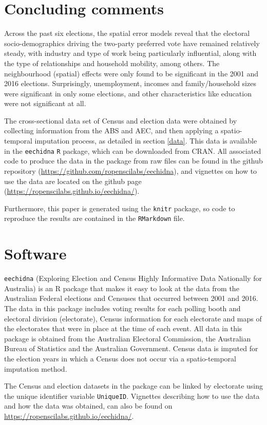 \documentclass[openany]{book}
\begin{document}
\hypertarget{concluding-comments}{%
\chapter{Concluding comments}\label{concluding-comments}}

Across the past six elections, the spatial error models reveal that the electoral socio-demographics driving the two-party preferred vote have remained relatively steady, with industry and type of work being particularly influential, along with the type of relationships and household mobility, among others. The neighbourhood (spatial) effects were only found to be significant in the 2001 and 2016 elections. Surprisingly, unemployment, incomes and family/household sizes were significant in only some elections, and other characteristics like education were not significant at all.

The cross-sectional data set of Census and election data were obtained by collecting information from the ABS and AEC, and then applying a spatio-temporal imputation process, as detailed in section \ref{data}. This data is available in the \texttt{eechidna} \texttt{R} package, which can be downloaded from CRAN. All associated code to produce the data in the package from raw files can be found in the github repository (\url{https://github.com/ropenscilabs/eechidna}), and vignettes on how to use the data are located on the github page (\url{https://ropenscilabs.github.io/eechidna/}).

Furthermore, this paper is generated using the \texttt{knitr} \citep{knitr} package, so code to reproduce the results are contained in the \texttt{RMarkdown} file.

\hypertarget{software}{%
\chapter{Software}\label{software}}

\texttt{eechidna} (Exploring Election and Census Highly Informative Data Nationally for Australia) is an R package that makes it easy to look at the data from the Australian Federal elections and Censuses that occurred between 2001 and 2016. The data in this package includes voting results for each polling booth and electoral division (electorate), Census information for each electorate and maps of the electorates that were in place at the time of each event. All data in this package is obtained from the Australian Electoral Commission, the Australian Bureau of Statistics and the Australian Government. Census data is imputed for the election years in which a Census does not occur via a spatio-temporal imputation method.

The Census and election datasets in the package can be linked by electorate using the unique identifier variable \texttt{UniqueID}. Vignettes describing how to use the data and how the data was obtained, can also be found on \url{https://ropenscilabs.github.io/eechidna/}.


\end{document}
